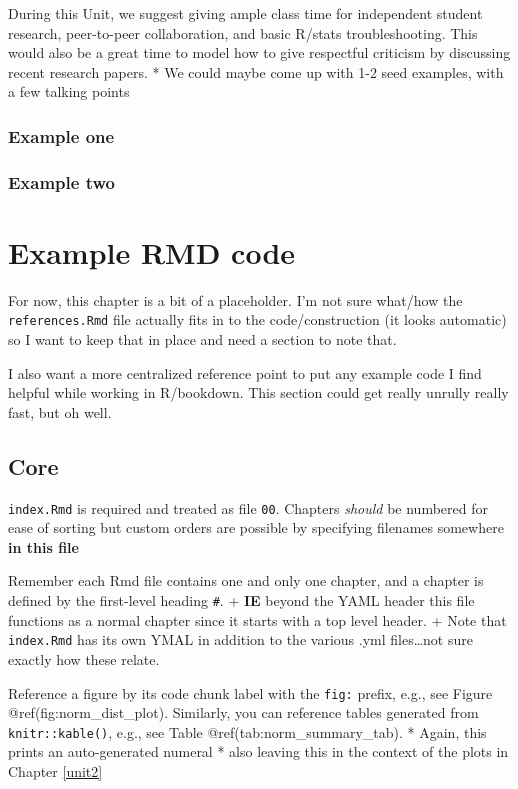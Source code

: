 \documentclass[
]{book}
\begin{document}
During this Unit, we suggest giving ample class time for independent student research, peer-to-peer collaboration, and basic R/stats troubleshooting. This would also be a great time to model how to give respectful criticism by discussing recent research papers.
* We could maybe come up with 1-2 seed examples, with a few talking points

\hypertarget{example-one}{%
\subsection{Example one}\label{example-one}}

\hypertarget{example-two}{%
\subsection{Example two}\label{example-two}}

\hypertarget{ex_code}{%
\chapter{Example RMD code}\label{ex_code}}

For now, this chapter is a bit of a placeholder. I'm not sure what/how the \texttt{references.Rmd} file actually fits in to the code/construction (it looks automatic) so I want to keep that in place and need a section to note that.

I also want a more centralized reference point to put any example code I find helpful while working in R/bookdown. This section could get really unrully really fast, but oh well.

\hypertarget{core}{%
\section{Core}\label{core}}

\texttt{index.Rmd} is required and treated as file \texttt{00}. Chapters \emph{should} be numbered for ease of sorting but custom orders are possible by specifying filenames somewhere \textbf{in this file}

Remember each Rmd file contains one and only one chapter, and a chapter is defined by the first-level heading \texttt{\#}.
+ \textbf{IE} beyond the YAML header this file functions as a normal chapter since it starts with a top level header.
+ Note that \texttt{index.Rmd} has its own YMAL in addition to the various .yml files\ldots not sure exactly how these relate.

Reference a figure by its code chunk label with the \texttt{fig:} prefix, e.g., see Figure @ref(fig:norm\_dist\_plot). Similarly, you can reference tables generated from \texttt{knitr::kable()}, e.g., see Table @ref(tab:norm\_summary\_tab).
* Again, this prints an auto-generated numeral
* also leaving this in the context of the plots in Chapter \ref{unit2}
\end{document}
